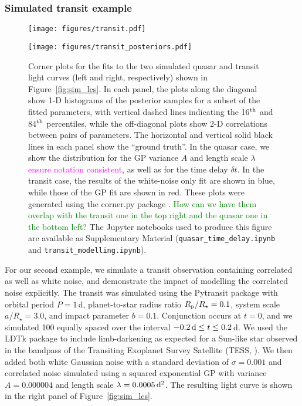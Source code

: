 \documentclass[letterpaper]{ar-1col}
\newcommand{\suz}[1]{\textcolor{magenta}{#1}}
\newcommand{\dan}[1]{\textcolor{green}{#1}}
\begin{document}
\subsubsection{Simulated transit example}
\label{sec:sim_transit}

\begin{figure}[ht]
  \centering
  \begin{minipage}[t]{0.5\linewidth}
    \texttt{[image: figures/transit.pdf]}
  \end{minipage} \hfill
  \begin{minipage}[t]{0.44\linewidth}
    \texttt{[image: figures/transit\_posteriors.pdf]}
  \end{minipage}
  \caption{Corner plots for the fits to the two simulated quasar and transit light curves (left and right, respectively) shown in Figure~\ref{fig:sim_lcs}.
  In each panel, the plots along the diagonal show 1-D histograms of the posterior samples for a subset of the fitted parameters, with vertical dashed lines indicating the 16$^{\rm th}$ and 84$^{\rm th}$ percentiles, while the off-diagonal plots show 2-D correlations between pairs of parameters. The horizontal and vertical solid black lines in each panel show the ``ground truth''. In the quasar case, we show the distribution for the GP variance $A$ and length scale $\lambda$ \suz{ensure notation consistent}, as well as for the time delay $\delta t$. In the transit case, the results of the white-noise only fit are shown in blue, while those of the GP fit are shown in red. These plots were generated using the {\sc corner.py} package \citep{corner}. \dan{How can we have them overlap with the transit one in the top right and the quasar one in the bottom left?} The {\sc Jupyter} notebooks used to produce this figure are available as Supplementary Material (\texttt{quasar\_time\_delay.ipynb} and \texttt{transit\_modelling.ipynb}).}
  \label{fig:sim_posteriors}
\end{figure}

For our second example, we simulate a transit observation containing correlated as well as white noise, and demonstrate the impact of modelling the correlated noise explicitly. The transit was simulated using the {\sc Pytransit} package \citep{2015MNRAS.450.3233P} with orbital period $P=1$\,d, planet-to-star radius ratio $R_{\rm p}/R_\star=0.1$, system scale $a/R_\star=3.0$, and impact parameter $b=0.1$. Conjunction occurs at $t=0$, and we simulated 100 equally spaced over the interval $-0.2\,{\rm d} \le t \le 0.2$\,d. We used the {\sc LDTk} package \citep{2015MNRAS.453.3821P} to include limb-darkening as expected for a Sun-like star observed in the bandpass of the Transiting Exoplanet Survey Satellite (TESS, \citealt{2015JATIS...1a4003R}). We then added both white Gaussian noise with a standard deviation of $\sigma=0.001$ and correlated noise simulated using a squared exponential GP with variance $A=0.000004$ and length scale $\lambda=0.0005\,{\rm d}^2$. The resulting light curve is shown in the right panel of Figure~\ref{fig:sim_lcs}.
\end{document}
